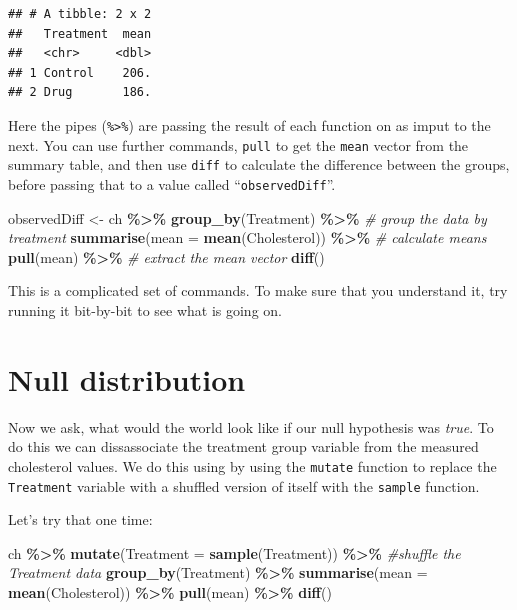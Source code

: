 \documentclass[
  a4paperpaper,
]{book}
\newenvironment{Shaded}{\begin{snugshade}}{\end{snugshade}}
\newcommand{\CommentTok}[1]{\textcolor[rgb]{0.56,0.35,0.01}{\textit{#1}}}
\newcommand{\DataTypeTok}[1]{\textcolor[rgb]{0.13,0.29,0.53}{#1}}
\newcommand{\KeywordTok}[1]{\textcolor[rgb]{0.13,0.29,0.53}{\textbf{#1}}}
\newcommand{\NormalTok}[1]{#1}
\newcommand{\OperatorTok}[1]{\textcolor[rgb]{0.81,0.36,0.00}{\textbf{#1}}}
\newcommand{\StringTok}[1]{\textcolor[rgb]{0.31,0.60,0.02}{#1}}
\begin{document}
\begin{verbatim}
## # A tibble: 2 x 2
##   Treatment  mean
##   <chr>     <dbl>
## 1 Control    206.
## 2 Drug       186.
\end{verbatim}

Here the pipes (\texttt{\%\textgreater{}\%}) are passing the result of each function on as imput to the next.
You can use further commands, \texttt{pull} to get the \texttt{mean} vector from the summary table, and then use \texttt{diff} to calculate the difference between the groups, before passing that to a value called ``\texttt{observedDiff}''.

\begin{Shaded}
\begin{Highlighting}[]
\NormalTok{observedDiff \textless{}{-}}\StringTok{ }\NormalTok{ch }\OperatorTok{\%\textgreater{}\%}
\StringTok{  }\KeywordTok{group\_by}\NormalTok{(Treatment) }\OperatorTok{\%\textgreater{}\%}\StringTok{ }\CommentTok{\# group the data by treatment}
\StringTok{  }\KeywordTok{summarise}\NormalTok{(}\DataTypeTok{mean =} \KeywordTok{mean}\NormalTok{(Cholesterol)) }\OperatorTok{\%\textgreater{}\%}\StringTok{ }\CommentTok{\# calculate means}
\StringTok{  }\KeywordTok{pull}\NormalTok{(mean) }\OperatorTok{\%\textgreater{}\%}\StringTok{ }\CommentTok{\# extract the mean vector}
\StringTok{  }\KeywordTok{diff}\NormalTok{()}
\end{Highlighting}
\end{Shaded}

This is a complicated set of commands. To make sure that you understand it, try running it bit-by-bit to see what is going on.

\hypertarget{null-distribution}{%
\section{Null distribution}\label{null-distribution}}

Now we ask, what would the world look like if our null hypothesis was \emph{true}. To do this we can dissassociate the treatment group variable from the measured cholesterol values. We do this using by using the \texttt{mutate} function to replace the \texttt{Treatment} variable with a shuffled version of itself with the \texttt{sample} function.

Let's try that one time:

\begin{Shaded}
\begin{Highlighting}[]
\NormalTok{ch }\OperatorTok{\%\textgreater{}\%}
\StringTok{  }\KeywordTok{mutate}\NormalTok{(}\DataTypeTok{Treatment =} \KeywordTok{sample}\NormalTok{(Treatment)) }\OperatorTok{\%\textgreater{}\%}\StringTok{ }\CommentTok{\#shuffle the Treatment data}
\StringTok{  }\KeywordTok{group\_by}\NormalTok{(Treatment) }\OperatorTok{\%\textgreater{}\%}
\StringTok{  }\KeywordTok{summarise}\NormalTok{(}\DataTypeTok{mean =} \KeywordTok{mean}\NormalTok{(Cholesterol)) }\OperatorTok{\%\textgreater{}\%}
\StringTok{  }\KeywordTok{pull}\NormalTok{(mean) }\OperatorTok{\%\textgreater{}\%}
\StringTok{  }\KeywordTok{diff}\NormalTok{()}
\end{Highlighting}
\end{Shaded}
\end{document}
